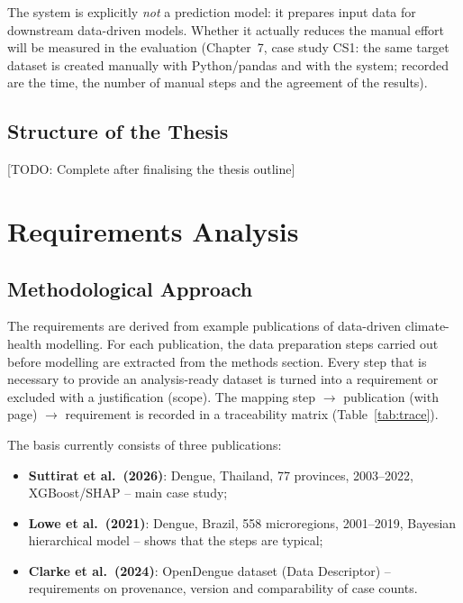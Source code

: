 \documentclass[11pt,a4paper]{article}
\newcommand{\todo}[1]{\textcolor{red!70!black}{[TODO: #1]}}
\begin{document}
The system is explicitly \emph{not} a prediction model: it prepares input data
for downstream data-driven models. Whether it actually reduces the manual effort
will be measured in the evaluation (Chapter~7, case study CS1: the same target
dataset is created manually with Python/pandas and with the system; recorded are
the time, the number of manual steps and the agreement of the results).

\subsection{Structure of the Thesis}
\todo{Complete after finalising the thesis outline}

\setcounter{section}{2}
\section{Requirements Analysis}

\subsection{Methodological Approach}

The requirements are derived from example publications of data-driven
climate-health modelling. For each publication, the data preparation steps carried
out before modelling are extracted from the methods section. Every step that is
necessary to provide an analysis-ready dataset is turned into a requirement or
excluded with a justification (scope). The mapping step $\rightarrow$ publication
(with page) $\rightarrow$ requirement is recorded in a traceability matrix
(Table~\ref{tab:trace}).

The basis currently consists of three publications:
\begin{itemize}[nosep]
  \item \textbf{Suttirat et al.\ (2026)}: Dengue, Thailand, 77 provinces,
        2003--2022, XGBoost/SHAP -- main case study;
  \item \textbf{Lowe et al.\ (2021)}: Dengue, Brazil, 558 microregions,
        2001--2019, Bayesian hierarchical model -- shows that the steps are
        typical;
  \item \textbf{Clarke et al.\ (2024)}: OpenDengue dataset (Data Descriptor) --
        requirements on provenance, version and comparability of case counts.
\end{itemize}
\end{document}
